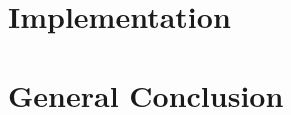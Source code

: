 \documentclass[12pt]{report}
\begin{document}
\setcounter{chapter}{5} 
\chapter{Implementation} %
\label{chap:implementation}


\pagebreak  %






\newpage

\chapter*{General Conclusion}




\end{document}
